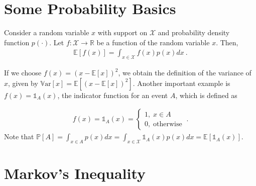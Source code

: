 \documentclass[11pt]{article}
\newcommand{\E}[1]{\mathbb{E}\left[ #1 \right]}
\newcommand{\prob}[1]{\mathbb{P}\left[ #1 \right]}
\newcommand{\var}[1]{\mathbb{V}\text{ar}\left[ #1 \right]}
\newcommand{\calX}{\mathcal{X}}
\begin{document}
\section{Some Probability Basics}

Consider a random variable $x$ with support on $\mathcal{X}$ and probability density function $p(\cdot)$. Let $f:\mathcal{X} \to \mathbb{R}$ be a function of the random variable $x$. Then,
\begin{align}
    \label{eq: expectation of a function}
    \E{f(x)} = \int_{x \in \calX} f(x) p(x) dx~.
\end{align}

If we choose $f(x) = (x - \E{x})^2$, we obtain the definition of the variance of $x$, given by $\var{x} = \E{(x - \E{x})^2}$. Another important example is $f(x) = \mathbb{1}_A(x)$, the indicator function for an event $A$, which is defined as 

\begin{align}
    f(x) = \mathbb{1}_A(x) = \begin{cases}
        1, \; x \in A \\
        0, \; \text{otherwise}
    \end{cases}~.
\end{align}
Note that $\prob{A} = \int_{x \in A} p(x) dx = \int_{x \in \calX} \mathbb{1}_A(x) p(x) dx = \E{\mathbb{1}_A(x)}$.

\section{Markov's Inequality}
\end{document}
